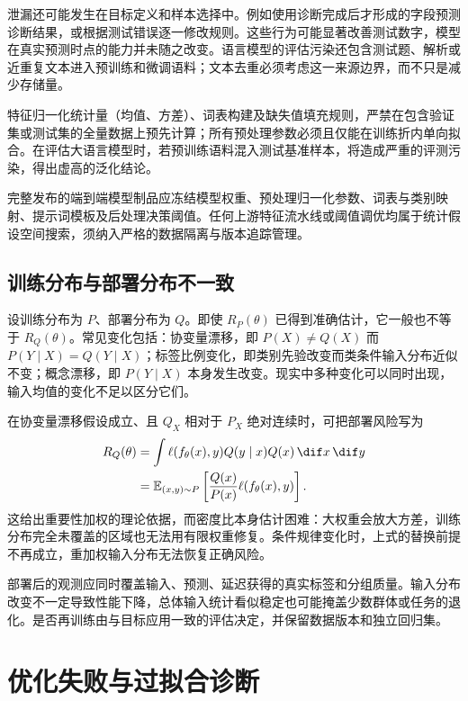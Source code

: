 \documentclass[../textbook.tex]{subfiles}
\begin{document}
泄漏还可能发生在目标定义和样本选择中。例如使用诊断完成后才形成的字段预测诊断结果，或根据测试错误逐一修改规则。这些行为可能显著改善测试数字，模型在真实预测时点的能力并未随之改变。语言模型的评估污染还包含测试题、解析或近重复文本进入预训练和微调语料；文本去重必须考虑这一来源边界，而不只是减少存储量。

\begin{warning}[预处理统计与评估数据污染]
特征归一化统计量（均值、方差）、词表构建及缺失值填充规则，严禁在包含验证集或测试集的全量数据上预先计算；所有预处理参数必须且仅能在训练折内单向拟合。在评估大语言模型时，若预训练语料混入测试基准样本，将造成严重的评测污染，得出虚高的泛化结论。
\end{warning}

完整发布的端到端模型制品应冻结模型权重、预处理归一化参数、词表与类别映射、提示词模板及后处理决策阈值。任何上游特征流水线或阈值调优均属于统计假设空间搜索，须纳入严格的数据隔离与版本追踪管理。

\subsection{训练分布与部署分布不一致}
设训练分布为 $P$、部署分布为 $Q$。即使 $R_P(\theta)$ 已得到准确估计，它一般也不等于 $R_Q(\theta)$。常见变化包括：协变量漂移，即 $P(X)\ne Q(X)$ 而 $P(Y\mid X)=Q(Y\mid X)$；标签比例变化，即类别先验改变而类条件输入分布近似不变；概念漂移，即 $P(Y\mid X)$ 本身发生改变。现实中多种变化可以同时出现，输入均值的变化不足以区分它们。

在协变量漂移假设成立、且 $Q_X$ 相对于 $P_X$ 绝对连续时，可把部署风险写为
\begin{align}
 R_Q(\theta)
 &=\int \ell(f_\theta(x),y)Q(y\mid x)Q(x)\,\dif x\,\dif y\notag\\
 &=\mathbb E_{(x,y)\sim P}\left[\frac{Q(x)}{P(x)}\ell(f_\theta(x),y)\right].
\end{align}
这给出重要性加权的理论依据，而密度比本身估计困难：大权重会放大方差，训练分布完全未覆盖的区域也无法用有限权重修复。条件规律变化时，上式的替换前提不再成立，重加权输入分布无法恢复正确风险。

部署后的观测应同时覆盖输入、预测、延迟获得的真实标签和分组质量。输入分布改变不一定导致性能下降，总体输入统计看似稳定也可能掩盖少数群体或任务的退化。是否再训练由与目标应用一致的评估决定，并保留数据版本和独立回归集。

\section{优化失败与过拟合诊断}
\end{document}
